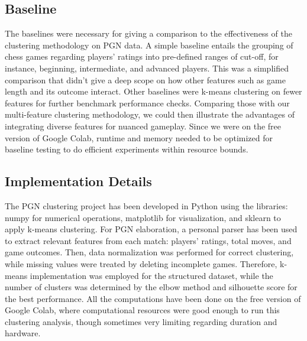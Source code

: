 \documentclass[conference]{IEEEtran}
\begin{document}
\subsection{Baseline}
The baselines were necessary for giving a comparison to the effectiveness of the clustering methodology on PGN data. A simple baseline entails the grouping of chess games regarding players' ratings into pre-defined ranges of cut-off, for instance, beginning, intermediate, and advanced players. This was a simplified comparison that didn't give a deep scope on how other features such as game length and its outcome interact. Other baselines were k-means clustering on fewer features for further benchmark performance checks. Comparing those with our multi-feature clustering methodology, we could then illustrate the advantages of integrating diverse features for nuanced gameplay. Since we were on the free version of Google Colab, runtime and memory needed to be optimized for baseline testing to do efficient experiments within resource bounds.

\subsection{Implementation Details}
The PGN clustering project has been developed in Python using the libraries: numpy for numerical operations, matplotlib for visualization, and sklearn to apply k-means clustering. For PGN elaboration, a personal parser has been used to extract relevant features from each match: players' ratings, total moves, and game outcomes. Then, data normalization was performed for correct clustering, while missing values were treated by deleting incomplete games. Therefore, k-means implementation was employed for the structured dataset, while the number of clusters was determined by the elbow method and silhouette score for the best performance. All the computations have been done on the free version of Google Colab, where computational resources were good enough to run this clustering analysis, though sometimes very limiting regarding duration and hardware.
\end{document}
